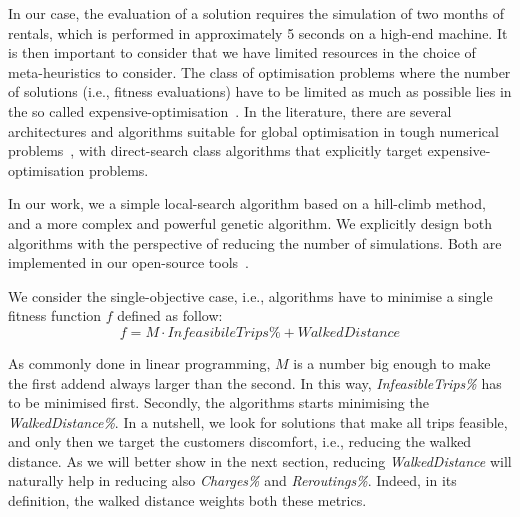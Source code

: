 \documentclass[review, letterpaper,3p, 11pt]{elsarticle}
\providecommand{\DIFaddtex}[1]{{\protect\color{blue}\uwave{#1}}} %
\providecommand{\DIFaddbegin}{} %
\providecommand{\DIFaddend}{} %
\providecommand{\DIFdelbegin}{} %
\providecommand{\DIFdelend}{} %
\providecommand{\DIFadd}[1]{\texorpdfstring{\DIFaddtex{#1}}{#1}} %
\providecommand{\DIFdel}[1]{} %
\begin{document}
In our case, the evaluation of a solution requires the simulation of two months of rentals, which is performed in approximately 5 seconds on a high-end machine. It is then important to consider that we have limited resources in the choice of meta-heuristics to consider. 
The class of optimisation problems where the number of solutions (i.e., fitness evaluations) have to be limited as much as possible lies in the so called expensive-optimisation~\cite{RA09,FP09}. 
In the literature, there are several architectures and algorithms suitable for global optimisation in tough numerical problems~\cite{FP09}, with direct-search class algorithms that explicitly target expensive-optimisation problems. %

In our work, we \DIFdelbegin \DIFdel{consdier }\DIFdelend \DIFaddbegin \DIFadd{consider }\DIFaddend a simple local-search algorithm based on a hill-climb method, and a more complex and powerful genetic algorithm. We explicitly design both algorithms with the perspective of reducing the number of simulations. Both are implemented in our open-source tools~\cite{MicheleGithub}.

We consider the single-objective case, i.e., algorithms have to minimise a single fitness function $f$ defined as follow:
$$f = M \cdot InfeasibileTrips\% + WalkedDistance$$

As commonly done in linear programming, $M$ is a number big enough to make the first addend always larger than the second.
In this way, \textit{InfeasibleTrips\%} has to be minimised first. Secondly, the algorithms starts minimising the \textit{WalkedDistance\%}. In a nutshell, we look for solutions that make all trips feasible, and only then we target the customers discomfort, i.e., reducing the walked distance. 
As we will better show in the next section, reducing \textit{WalkedDistance} will naturally help in reducing also \textit{Charges\%} and \textit{Reroutings\%}. Indeed, in its definition, the walked distance weights both these metrics.
\end{document}
